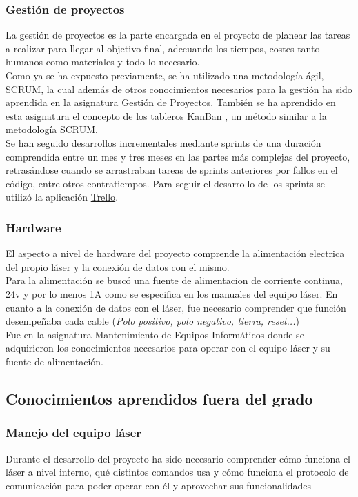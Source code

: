 	\subsubsection{Gestión de proyectos}
		La gestión de proyectos es la parte encargada en el proyecto de planear las tareas a realizar para llegar al objetivo final, adecuando los tiempos, costes tanto humanos como 				materiales y todo lo necesario. \\ Como ya se ha expuesto previamente, se ha utilizado una metodología ágil, SCRUM, la cual además de otros conocimientos necesarios para la 				gestión ha sido aprendida en la asignatura Gestión de Proyectos. También se ha aprendido en esta asignatura el concepto de los tableros KanBan %
		, un método similar a la metodología SCRUM.\\
Se han seguido desarrollos incrementales mediante sprints de una duración comprendida entre un mes y tres meses en las partes más complejas del proyecto, retrasándose cuando se arrastraban tareas de sprints anteriores por fallos en el código, entre otros contratiempos. Para seguir el desarrollo de los sprints se utilizó la aplicación \href{https://trello.com/}{Trello}.\\
	\subsubsection{Hardware}
		El aspecto a nivel de hardware del proyecto comprende  la alimentación electrica del propio láser y la conexión de datos con el mismo.\\
		Para la alimentación se buscó una fuente de alimentacion de corriente continua, 24v y por lo menos 1A como se especifica en los manuales del equipo láser.
		En cuanto a la conexión de datos con el láser, fue necesario comprender que función desempeñaba cada cable (\textit{Polo positivo, polo negativo, tierra, reset...})\\
		Fue en la asignatura Mantenimiento de Equipos Informáticos donde se adquirieron los conocimientos necesarios para operar con el equipo láser y su fuente de alimentación.\\

	
	\subsection{Conocimientos aprendidos fuera del grado}


		\subsubsection{Manejo del equipo láser}
			Durante el desarrollo del proyecto ha sido necesario comprender cómo funciona el láser a nivel interno, qué distintos comandos usa y cómo funciona el protocolo de 						comunicación para poder operar con él y aprovechar sus funcionalidades\\

